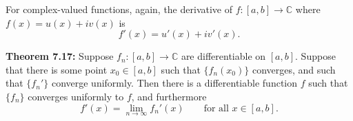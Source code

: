 \documentclass[12pt]{book}
\newcommand{\C}{{\mathbb{C}}}
\theoremstyle{plain}
\theoremstyle{remark}
\theoremstyle{definition}
\theoremstyle{exercise}
\theoremstyle{example}
\begin{document}
\medskip

For complex-valued functions, again, the derivative of $f \colon [a,b] \to
\C$ where $f(x) = u(x)+iv(x)$ is
\begin{equation*}
f'(x) = u'(x)+iv'(x) .
\end{equation*}

\medskip

\textbf{Theorem 7.17:}
Suppose $f_n \colon [a,b] \to \C$ are differentiable on $[a,b]$.
Suppose that there is some point $x_0 \in [a,b]$ such that $\{ f_n(x_0) \}$
converges, and such that $\{ f_n' \}$ converge uniformly.
Then there is a differentiable function $f$ such that
$\{ f_n \}$ converges uniformly to $f$, and furthermore
$$
f'(x) = \lim_{n\to\infty} f_n'(x) \qquad \text{for all $x \in [a,b]$.}
$$

\medskip
\end{document}
